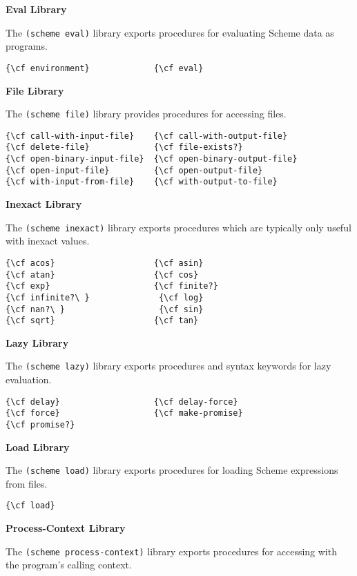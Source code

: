 \textbf{Eval Library}

The \texttt{(scheme eval)} library exports procedures for evaluating Scheme
data as programs.

\begin{verbatim}
{\cf environment}             {\cf eval}
\end{verbatim}

\textbf{File Library}

The \texttt{(scheme file)} library provides procedures for accessing
files.

\begin{verbatim}
{\cf call-with-input-file}    {\cf call-with-output-file}
{\cf delete-file}             {\cf file-exists?}
{\cf open-binary-input-file}  {\cf open-binary-output-file}
{\cf open-input-file}         {\cf open-output-file}
{\cf with-input-from-file}    {\cf with-output-to-file}
\end{verbatim}

\textbf{Inexact Library}

The \texttt{(scheme inexact)} library exports procedures which are
typically only useful with inexact values.

\begin{verbatim}
{\cf acos}                    {\cf asin}
{\cf atan}                    {\cf cos}
{\cf exp}                     {\cf finite?}
{\cf infinite?\ }              {\cf log}
{\cf nan?\ }                   {\cf sin}
{\cf sqrt}                    {\cf tan}
\end{verbatim}

\textbf{Lazy Library}

The \texttt{(scheme lazy)} library exports procedures and syntax keywords for lazy evaluation.

\begin{verbatim}
{\cf delay}                   {\cf delay-force}
{\cf force}                   {\cf make-promise}
{\cf promise?}
\end{verbatim}

\textbf{Load Library}

The \texttt{(scheme load)} library exports procedures for loading
Scheme expressions from files.

\begin{verbatim}
{\cf load}
\end{verbatim}

\textbf{Process-Context Library}

The \texttt{(scheme process-context)} library exports procedures for
accessing with the program's calling context.

